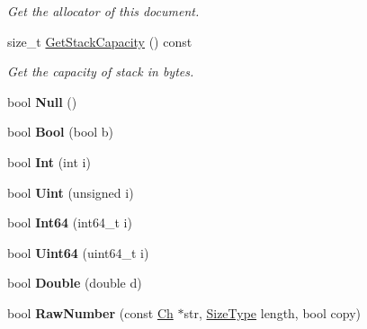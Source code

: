 \begin{DoxyCompactItemize}
\begin{DoxyCompactList}\small\item\em Get the allocator of this document. \end{DoxyCompactList}\item 
size\+\_\+t \hyperlink{classGenericDocument_aa99f03016f4907332fcf70aadb645194}{Get\+Stack\+Capacity} () const \hypertarget{classGenericDocument_aa99f03016f4907332fcf70aadb645194}{}\label{classGenericDocument_aa99f03016f4907332fcf70aadb645194}

\begin{DoxyCompactList}\small\item\em Get the capacity of stack in bytes. \end{DoxyCompactList}\item 
bool {\bfseries Null} ()\hypertarget{classGenericDocument_a87dc7f66b2b92660b8a43546733f9df2}{}\label{classGenericDocument_a87dc7f66b2b92660b8a43546733f9df2}

\item 
bool {\bfseries Bool} (bool b)\hypertarget{classGenericDocument_a4c44780642518dd34bd241a1ea0ceaf1}{}\label{classGenericDocument_a4c44780642518dd34bd241a1ea0ceaf1}

\item 
bool {\bfseries Int} (int i)\hypertarget{classGenericDocument_a8cc986266becaa268474c607489745c7}{}\label{classGenericDocument_a8cc986266becaa268474c607489745c7}

\item 
bool {\bfseries Uint} (unsigned i)\hypertarget{classGenericDocument_a530dd899a04a00ba74f52507b488d2c1}{}\label{classGenericDocument_a530dd899a04a00ba74f52507b488d2c1}

\item 
bool {\bfseries Int64} (int64\+\_\+t i)\hypertarget{classGenericDocument_a934b1b7a7ed89917615a5410db77a942}{}\label{classGenericDocument_a934b1b7a7ed89917615a5410db77a942}

\item 
bool {\bfseries Uint64} (uint64\+\_\+t i)\hypertarget{classGenericDocument_a50ac3451a1afd0ce248dcc023d5e09e8}{}\label{classGenericDocument_a50ac3451a1afd0ce248dcc023d5e09e8}

\item 
bool {\bfseries Double} (double d)\hypertarget{classGenericDocument_a934bf7a5d1ff062ab079756d842e4f6b}{}\label{classGenericDocument_a934bf7a5d1ff062ab079756d842e4f6b}

\item 
bool {\bfseries Raw\+Number} (const \hyperlink{classGenericValue_ade0e0ce64ccd5d852da57a35e720bafb}{Ch} $\ast$str, \hyperlink{rapidjson_8h_a5ed6e6e67250fadbd041127e6386dcb5}{Size\+Type} length, bool copy)\hypertarget{classGenericDocument_af703994dec5af6ef049a24b5243aceab}{}\label{classGenericDocument_af703994dec5af6ef049a24b5243aceab}


\end{DoxyCompactItemize}
